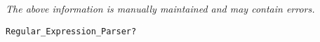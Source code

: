 \label{pkg:awk\_syntax}

{\tiny \it The above information is manually maintained and may contain errors.}
\begin{verbatim}
Regular_Expression_Parser?
\end{verbatim}
